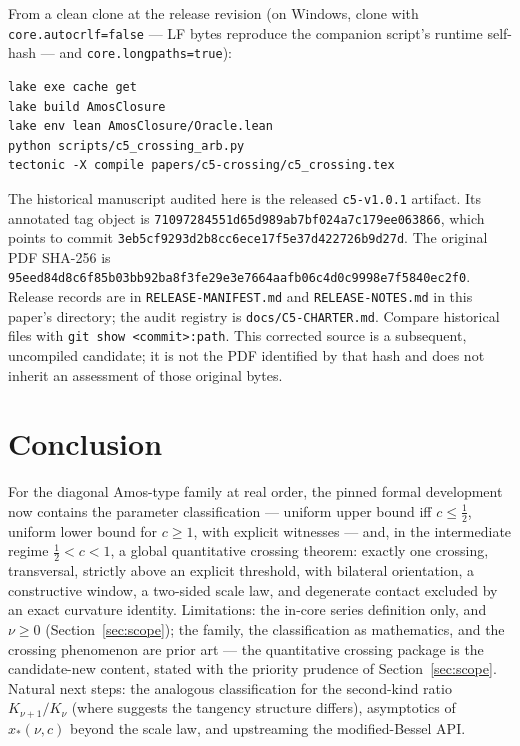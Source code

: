 \documentclass[11pt]{article}
\newcommand{\lean}[1]{\texttt{#1}}
\begin{document}
\medskip
\noindent From a clean clone at the release revision (on Windows,
clone with \lean{core.autocrlf=false} --- LF bytes reproduce the
companion script's runtime self-hash --- and
\lean{core.longpaths=true}):
\begin{verbatim}
lake exe cache get
lake build AmosClosure
lake env lean AmosClosure/Oracle.lean
python scripts/c5_crossing_arb.py
tectonic -X compile papers/c5-crossing/c5_crossing.tex
\end{verbatim}
{\sloppy
The historical manuscript audited here is the released
\lean{c5-v1.0.1} artifact.  Its annotated tag object is
\nolinkurl{71097284551d65d989ab7bf024a7c179ee063866}, which points to commit
\nolinkurl{3eb5cf9293d2b8cc6ece17f5e37d422726b9d27d}.
The original PDF SHA-256 is
\nolinkurl{95eed84d8c6f85b03bb92ba8f3fe29e3e7664aafb06c4d0c9998e7f5840ec2f0}.
Release records are in \lean{RELEASE-MANIFEST.md} and
\lean{RELEASE-NOTES.md} in this paper's directory; the audit registry is
\lean{docs/C5-CHARTER.md}.  Compare historical files with
\lean{git show <commit>:path}.  This corrected source is a subsequent,
uncompiled candidate; it is not the PDF identified by that hash and does
not inherit an assessment of those original bytes.\par}

\section{Conclusion}

For the diagonal Amos-type family at real order, the pinned formal
development now contains the parameter classification ---
uniform upper bound iff $c \le \tfrac12$, uniform lower bound for
$c \ge 1$, with explicit witnesses --- and, in the
intermediate regime $\tfrac12 < c < 1$, a global quantitative
crossing theorem: exactly one crossing, transversal, strictly above
an explicit threshold, with bilateral orientation, a constructive
window, a two-sided scale law, and degenerate contact excluded by
an exact curvature identity.  Limitations: the in-core series
definition only, and $\nu \ge 0$ (Section~\ref{sec:scope}); the
family, the classification as mathematics, and the crossing
phenomenon are prior art \cite{RS16} --- the quantitative crossing
package is the candidate-new content, stated with the priority
prudence of Section~\ref{sec:scope}.  Natural next steps: the
analogous classification for the second-kind ratio
$K_{\nu+1}/K_\nu$ (where \cite{Segura23} suggests the tangency
structure differs), asymptotics of $x_*(\nu,c)$ beyond the scale
law, and upstreaming the modified-Bessel API.
\end{document}
